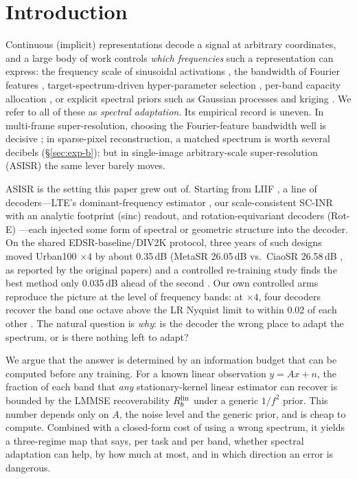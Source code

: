 \section{Introduction}\label{sec:intro}

Continuous (implicit) representations decode a signal at arbitrary
coordinates, and a large body of work controls \emph{which frequencies} such a
representation can express: the frequency scale of sinusoidal activations
\citep{sitzmann2020siren,liu2024finer}, the bandwidth of Fourier features
\citep{tancik2020fourier}, target-spectrum-driven hyper-parameter selection
\citep{kania2025fresh,winner2025,sec2026}, per-band capacity allocation
\citep{wieninr}, or explicit spectral priors such as Gaussian processes and
kriging \citep{rasmussen2006gp}. We refer to all of these as \emph{spectral
adaptation}. Its empirical record is uneven. In multi-frame
super-resolution, choosing the Fourier-feature bandwidth well is decisive
\citep{superf2026}; in sparse-pixel reconstruction, a matched spectrum is
worth several decibels (\S\ref{sec:exp-b}); but in single-image
arbitrary-scale super-resolution (ASISR) the same lever barely moves.

ASISR is the setting this paper grew out of. Starting from LIIF
\citep{chen2021liif}, a line of decoders---LTE's dominant-frequency
estimator \citep{lee2022lte}, our scale-consistent SC-INR with an analytic
footprint (sinc) readout, and rotation-equivariant decoders (Rot-E)
---each injected some form of spectral or geometric
structure into the decoder. On the shared EDSR-baseline/DIV2K protocol,
three years of such designs moved Urban100 $\times4$ by about 0.35\,dB
(MetaSR 26.05\,dB \citep{hu2019metasr} vs.\ CiaoSR 26.58\,dB \citep{cao2023ciaosr}, as reported by the original papers)  and a
controlled re-training study finds the best method only 0.035\,dB ahead of the
second \citep{nasir2026empirical}. Our own controlled arms reproduce the
picture at the level of frequency bands: at $\times4$, four decoders recover
the band one octave above the LR Nyquist limit to within 0.02 of each other
. The natural question is \emph{why}: is the
decoder the wrong place to adapt the spectrum, or is there nothing left to
adapt?

We argue that the answer is determined by an information budget that can be
computed before any training. For a known linear observation $y=Ax+n$, the
fraction of each band that \emph{any} stationary-kernel linear estimator can
recover is bounded by the LMMSE recoverability $R_b^{\mathrm{lin}}$ under a generic
$1/f^2$ prior. This number depends only on $A$, the noise level and the
generic prior, and is cheap to compute. Combined with a closed-form cost of
using a wrong spectrum, it yields a three-regime map that says, per task and
per band, whether spectral adaptation can help, by how much at most, and in
which direction an error is dangerous.

